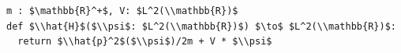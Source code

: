 \documentclass[border=10pt]{standalone}
\begin{document}
\begin{lstlisting}
m : $\mathbb{R}^+$, V: $L^2(\\mathbb{R})$
def $\\hat{H}$($\\psi$: $L^2(\\mathbb{R})$) $\to$ $L^2(\\mathbb{R})$:
  return $\\hat{p}^2$($\\psi$)/2m + V * $\\psi$
\end{lstlisting}
\end{document}
